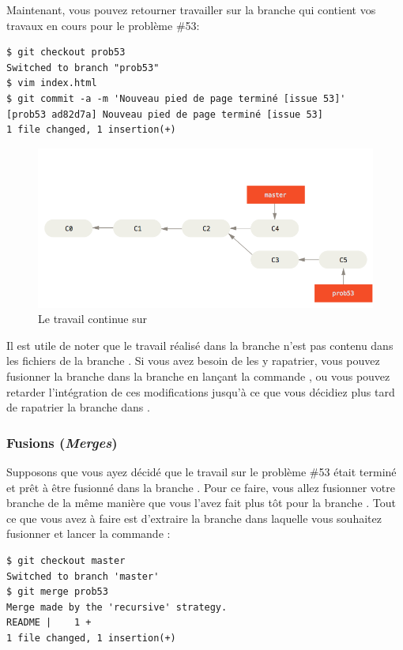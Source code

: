 Maintenant, vous pouvez retourner travailler sur la branche qui contient vos travaux en cours pour le problème \#53:
\begin{Schunk}
\begin{Verbatim}
$ git checkout prob53
Switched to branch "prob53"
$ vim index.html
$ git commit -a -m 'Nouveau pied de page terminé [issue 53]'
[prob53 ad82d7a] Nouveau pied de page terminé [issue 53]
1 file changed, 1 insertion(+)
\end{Verbatim}
\end{Schunk}

\begin{figure}[H]
  \centering
  \includegraphics{images/basic-branching-6}
  \caption{Le travail continue sur }
  \label{fig:git:basic-branching-6}
\end{figure}

Il est utile de noter que le travail réalisé dans la branche  n'est pas contenu dans les fichiers de la branche .
Si vous avez besoin de les y rapatrier, vous pouvez fusionner la branche  dans la branche  en lançant la commande , ou vous pouvez retarder l'intégration de ces modifications jusqu'à ce que vous décidiez plus tard de rapatrier la branche  dans .


\subsubsection{Fusions (\emph{Merges})}
\label{sec:git:basic_merging}

Supposons que vous ayez décidé que le travail sur le problème \#53 était terminé et prêt à être fusionné dans la branche .
Pour ce faire, vous allez fusionner votre branche  de la même manière que vous l'avez fait plus tôt pour la branche .
Tout ce que vous avez à faire est d'extraire la branche dans laquelle vous souhaitez fusionner et lancer la commande :
\begin{Schunk}
\begin{Verbatim}
$ git checkout master
Switched to branch 'master'
$ git merge prob53
Merge made by the 'recursive' strategy.
README |    1 +
1 file changed, 1 insertion(+)
\end{Verbatim}
\end{Schunk}

